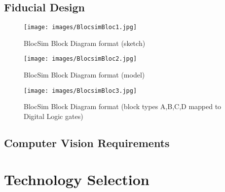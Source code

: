 \subsection{Fiducial Design}




\begin{figure}[ht!]
\centering
\texttt{[image: images/BlocsimBloc1.jpg]}
\caption{BlocSim Block Diagram format (sketch)}
\label{im:BlocsimBD1}
\end{figure}

\begin{figure}[ht!]
\centering
\texttt{[image: images/BlocsimBloc2.jpg]}
\caption{BlocSim Block Diagram format (model)}
\label{im:BlocsimBD2}
\end{figure}

\begin{figure}[ht!]
\centering
\texttt{[image: images/BlocsimBloc3.jpg]}
\caption{BlocSim Block Diagram format (block types A,B,C,D mapped to Digital Logic gates)}
\label{im:BlocsimBD3}
\end{figure}

\clearpage



\subsection{Computer Vision Requirements}





\section{Technology Selection}
\label{sec:techSelection}

